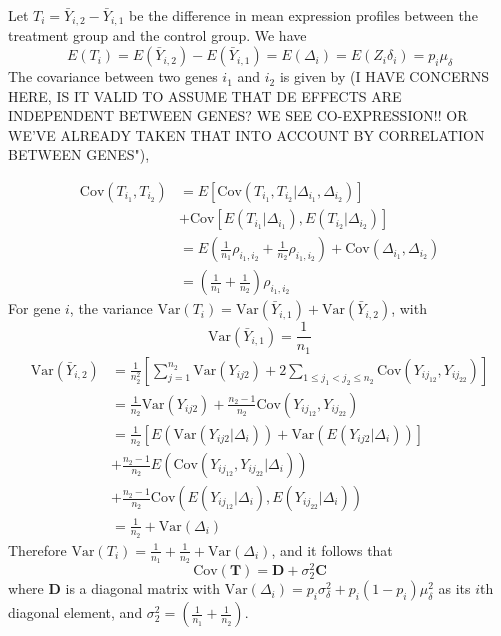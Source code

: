 \documentclass[a4,center,fleqn]{NAR}
\begin{document}
	Let $T_i=\bar{Y}_{i,2}-\bar{Y}_{i,1}$ be the difference in mean expression profiles between the
	treatment group and the control group. We have 
	\[E(T_i) = E(\bar{Y}_{i,2})-E(\bar{Y}_{i,1}) = E(\Delta_i) = E(Z_i\delta_i) = p_i\mu_{\delta}\]
	The covariance between two genes $i_1$ and $i_2$ is given by (I HAVE CONCERNS HERE, IS IT VALID TO
	ASSUME THAT DE EFFECTS ARE INDEPENDENT BETWEEN GENES?  WE SEE CO-EXPRESSION!! OR WE'VE ALREADY TAKEN
	THAT INTO ACCOUNT BY CORRELATION BETWEEN GENES"), 
	
	\begin{equation}
	\begin{aligned}
	\text{Cov}(T_{i_1}, T_{i_2}) & = E\left[\text{Cov}(T_{i_1}, T_{i_2}|\Delta_{i_1}, \Delta_{i_2})
	\right] \\
	&  + \text{Cov}\left[E(T_{i_1}|\Delta_{i_1}), E(T_{i_2}|\Delta_{i_2})\right] \\
	& = E\left(\frac{1}{n_1}\rho_{i_1,i_2} + \frac{1}{n_2}\rho_{i_1,i_2}\right) +
	\text{Cov}(\Delta_{i_1}, \Delta_{i_2})\\
	& = \left(\frac{1}{n_1} + \frac{1}{n_2}\right)\rho_{i_1,i_2}
	\end{aligned}
	\end{equation}
	For gene $i$, the variance $\text{Var}(T_i) = \text{Var}(\bar{Y}_{i, 1}) + \text{Var}(\bar{Y}_{i,
		2})$, with
	\[\text{Var}(\bar{Y}_{i, 1}) = \frac{1}{n_1}\] 
	\begin{equation}
	\begin{aligned}
	\text{Var}(\bar{Y}_{i, 2}) & = \frac{1}{n_2^2}\left[\sum_{j=1}^{n_2}\text{Var}(Y_{ij2}) +
	2\sum_{1\leq j_1<j_2 \leq n_2} \text{Cov}(Y_{ij_12}, Y_{ij_22})\right] \\
	& = \frac{1}{n_2}\text{Var}(Y_{ij2}) + \frac{n_2-1}{n_2} \text{Cov}(Y_{ij_12}, Y_{ij_22})\\
	& = \frac{1}{n_2}\left[E\left(\text{Var}(Y_{ij2}|\Delta_i)\right) +
	\text{Var}\left(E(Y_{ij2}|\Delta_i)\right)\right] \\ \text{~~~}
	&+\frac{n_2-1}{n_2}E\left(\text{Cov}(Y_{ij_12}, Y_{ij_22}|\Delta_i)\right) \\
	&+\frac{n_2-1}{n_2}\text{Cov}\left(E(Y_{ij_12}|\Delta_i), E(Y_{ij_22}|\Delta_i)\right) \\
	& = \frac{1}{n_2} + \text{Var}(\Delta_i)
	\end{aligned}
	\end{equation}
	Therefore $\text{Var}(T_i)  = \frac{1}{n_1} + \frac{1}{n_2} + \text{Var}(\Delta_i)$, and it follows
	that
	\begin{equation}\label{eq:tvar}
	\text{Cov}(\bm T) =  \bm D + \sigma_2^2\bm C 
	\end{equation}
	where $\bm D$ is a diagonal matrix with $\text{Var}(\Delta_i) =p_i\sigma_{\delta}^2 +
	p_i(1-p_i)\mu_{\delta}^2$ as its $i$th diagonal element, and $\sigma_2^2 = \left(\frac{1}{n_1} +
	\frac{1}{n_2}\right)$.
	
\end{document}

